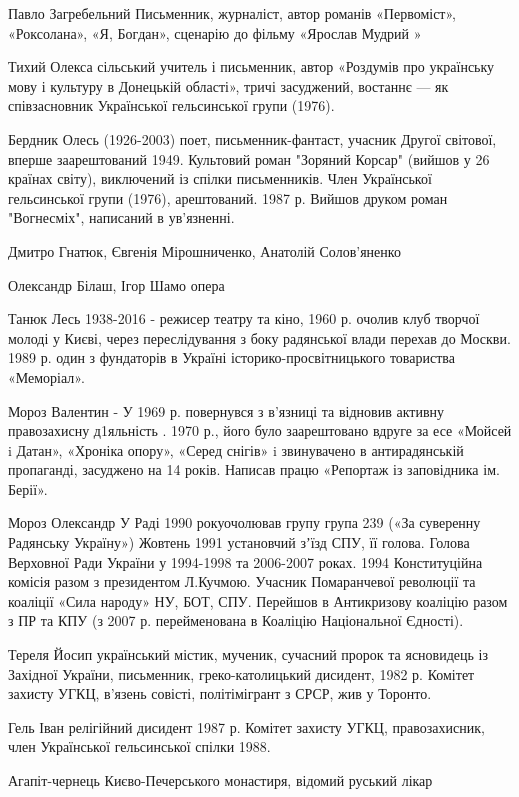 Павло Загребельний Письменник, журналіст, автор романів «Первоміст», «Роксолана», «Я, Бог­дан», сценарію до фільму «Ярослав Мудрий »

Тихий Олекса сільський учитель і письменник, автор «Роздумів про українську мову і культуру в Донецькій області», тричі засуджений, востаннє --- як співзасновник Української гельсинської групи (1976).

Бердник Олесь (1926-2003) поет, письменник-фантаст, учасник Другої світової, вперше заарештований 1949. Культовий роман "Зоряний Корсар" (вийшов у 26 країнах світу), виключений із спілки письменників. Член Української гельсинської групи (1976), арештований. 1987 р. Вийшов друком роман "Вогнесміх", написаний в ув'язненні.

Дмитро Гнатюк, Євгенія Мірошниченко, Анатолій Солов'яненко

Олександр Білаш, Ігор Шамо опера

Танюк Лесь 1938-2016 - режисер театру та кіно, 1960 р. очолив клуб творчої молоді у Києві, через переслідування з боку радянської влади перехав до Москви. 1989 р. один з фундаторів в Україні історико-просвітницького товариства «Меморіал».

Мороз Валентин - У 1969 р. повернувся з в’язниці та відновив активну правозахисну д1яльність . 1970 р., його було заарештовано вдруге за есе «Мойсей i Датан», «Хроніка опору», «Серед снігів» i звинувачено в антирадянській пропаганді, засуджено на 14 років. Написав працю «Репортаж із заповідника ім. Берії».

Мороз Олександр  У Раді 1990 рокуочолював групу група 239 («За суверенну Радянську Україну») Жовтень 1991 установчий зʼїзд СПУ, її голова.  Голова Верховної Ради України у 1994-1998 та 2006-2007 роках. 1994 Конституційна комісія  разом з президентом Л.Кучмою. Учасник Помаранчевої революції та коаліції «Сила народу» НУ, БОТ, СПУ. Перейшов в Антикризову коаліцію разом з ПР та КПУ (з 2007 р. перейменована в Коаліцію Національної Єдності).  

Тереля Йосип український містик, мученик, сучасний пророк та ясновидець із Західної України, письменник, греко-католицький дисидент, 1982 р. Комітет захисту УГКЦ, в'язень совісті, політімігрант з СРСР, жив у Торонто.

Гель Іван релігійний дисидент 1987 р. Комітет захисту УГКЦ, правозахисник, член Української гельсинської спілки 1988.




Агапіт-чернець Києво-Печерського монастиря, відомий руський лікар

